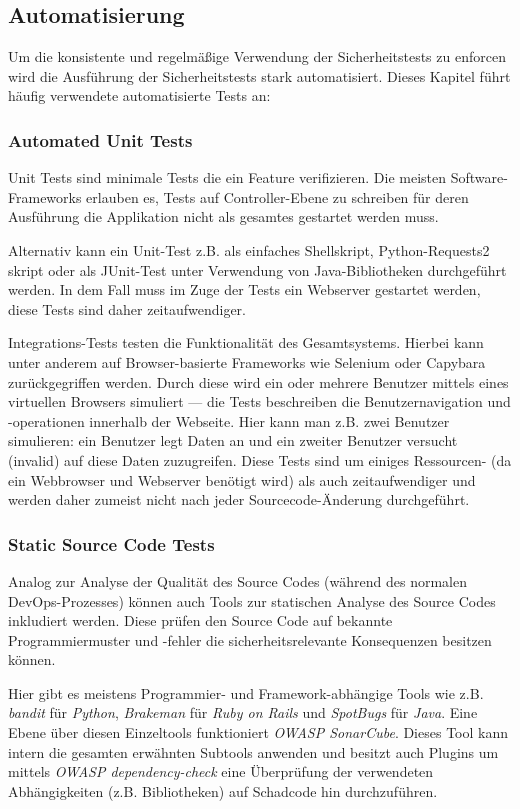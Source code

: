 \subsection{Automatisierung}

Um die konsistente und regelmäßige Verwendung der Sicherheitstests zu enforcen wird die Ausführung der Sicherheitstests stark automatisiert. Dieses Kapitel führt häufig verwendete automatisierte Tests an:

\subsubsection{Automated Unit Tests}

Unit Tests sind minimale Tests die ein Feature verifizieren. Die meisten Software-Frameworks erlauben es, Tests auf Controller-Ebene zu schreiben für deren Ausführung die Applikation nicht als gesamtes gestartet werden muss.

Alternativ kann ein Unit-Test z.B. als einfaches Shellskript, Python-Requests2 skript oder als JUnit-Test unter Verwendung von Java-Bibliotheken durchgeführt werden. In dem Fall muss im Zuge der Tests ein Webserver gestartet werden, diese Tests sind daher zeitaufwendiger.

Integrations-Tests testen die Funktionalität des Gesamtsystems. Hierbei kann unter anderem auf Browser-basierte Frameworks wie Selenium oder Capybara zurückgegriffen werden. Durch diese wird ein oder mehrere Benutzer mittels eines virtuellen Browsers simuliert --- die Tests beschreiben die Benutzernavigation und -operationen innerhalb der Webseite. Hier kann man z.B. zwei Benutzer simulieren: ein Benutzer legt Daten an und ein zweiter Benutzer versucht (invalid) auf diese Daten zuzugreifen. Diese Tests sind um einiges Ressourcen- (da ein Webbrowser und Webserver benötigt wird) als auch zeitaufwendiger und werden daher zumeist nicht nach jeder Sourcecode-Änderung durchgeführt.

\subsubsection{Static Source Code Tests}

Analog zur Analyse der Qualität des Source Codes (während des normalen DevOps-Prozesses) können auch Tools zur statischen Analyse des Source Codes inkludiert werden. Diese prüfen den Source Code auf bekannte Programmiermuster und -fehler die sicherheitsrelevante Konsequenzen besitzen können.

Hier gibt es meistens Programmier- und Framework-abhängige Tools wie z.B. \textit{bandit} für \textit{Python}, \textit{Brakeman} für \textit{Ruby on Rails} und \textit{SpotBugs} für \textit{Java}. Eine Ebene über diesen Einzeltools funktioniert \textit{OWASP SonarCube}. Dieses Tool kann intern die gesamten erwähnten Subtools anwenden und besitzt auch Plugins um mittels \textit{OWASP dependency-check} eine Überprüfung der verwendeten Abhängigkeiten (z.B. Bibliotheken) auf Schadcode hin durchzuführen.

